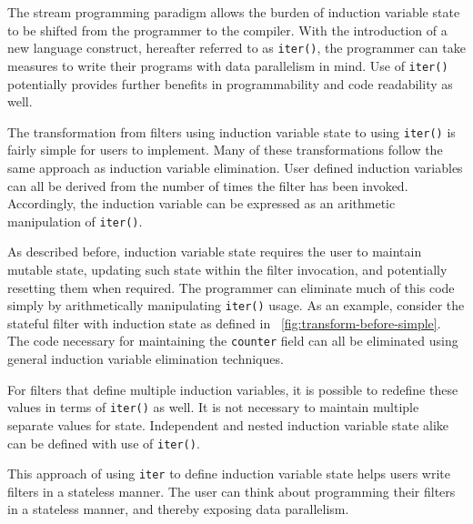 The stream programming paradigm allows the burden of induction variable state to be shifted from the programmer to the compiler.  With the introduction of a new language construct, hereafter referred to as {\tt iter()}, the programmer can take measures to write their programs with data parallelism in mind.  Use of {\tt iter()} potentially provides further benefits in programmability and code readability as well.

The transformation from filters using induction variable state to using {\tt iter()} is fairly simple for users to implement.  Many of these transformations follow the same approach as induction variable elimination.  User defined induction variables can all be derived from the number of times the filter has been invoked.  Accordingly, the induction variable can be expressed as an arithmetic manipulation of {\tt iter()}.  

As described before, induction variable state requires the user to maintain mutable state, updating such state within the filter invocation, and potentially resetting them when required. The programmer can eliminate much of this code simply by arithmetically manipulating {\tt iter()} usage.  As an example, consider the stateful filter with induction state as defined in ~\ref{fig:transform-before-simple}.  The code necessary for maintaining the {\tt counter} field can all be eliminated using general induction variable elimination techniques.  

For filters that define multiple induction variables, it is possible to redefine these values in terms of {\tt iter()} as well.  It is not necessary to maintain multiple separate values for state.  Independent and nested induction variable state alike can be defined with use of {\tt iter()}.

This approach of using {\tt iter} to define induction variable state helps users write filters in a stateless manner.  The user can think about programming their filters in a stateless manner, and thereby exposing data parallelism. 


